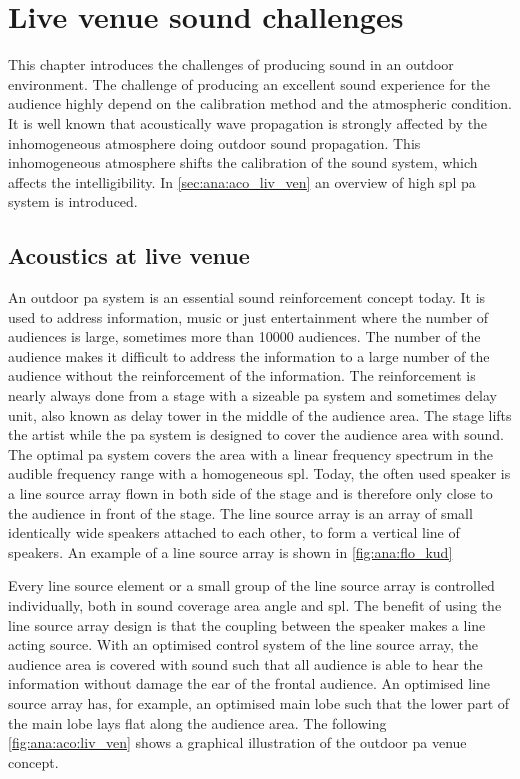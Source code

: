 \section{Live venue sound challenges}
This chapter introduces the challenges of producing sound in an outdoor environment. The challenge of producing an excellent sound experience for the audience highly depend on the calibration method and the atmospheric condition. It is well known that acoustically wave propagation is strongly affected by the inhomogeneous atmosphere doing outdoor sound propagation. This inhomogeneous atmosphere shifts the calibration of the sound system, which affects the intelligibility. In \autoref{sec:ana:aco_liv_ven} an overview of high \gls{spl} \gls{pa} system is introduced.



\subsection{Acoustics at live venue}\label{sec:ana:aco_liv_ven}
An outdoor \gls{pa} system is an essential sound reinforcement concept today. It is used to address information, music or just entertainment where the number of audiences is large, sometimes more than 10000 audiences. The number of the audience makes it difficult to address the information to a large number of the audience without the reinforcement of the information. The reinforcement is nearly always done from a stage with a sizeable \gls{pa} system and sometimes delay unit, also known as delay tower in the middle of the audience area. The stage lifts the artist while the \gls{pa} system is designed to cover the audience area with sound. The optimal \gls{pa} system covers the area with a linear frequency spectrum in the audible frequency range with a homogeneous \gls{spl}. Today, the often used speaker is a line source array flown in both side of the stage and is therefore only close to the audience in front of the stage. The line source array is an array of small identically wide speakers attached to each other, to form a vertical line of speakers. An example of a line source array is shown in \autoref{fig:ana:flo_kud}


Every line source element or a small group of the line source array is controlled individually, both in sound coverage area angle and \gls{spl}. The benefit of using the line source array design is that the coupling between the speaker makes a line acting source. With an optimised control system of the line source array, the audience area is covered with sound such that all audience is able to hear the information without damage the ear of the frontal audience. An optimised line source array has, for example, an optimised main lobe such that the lower part of the main lobe lays flat along the audience area.
The following \autoref{fig:ana:aco:liv_ven} shows a graphical illustration of the outdoor \gls{pa} venue concept.

